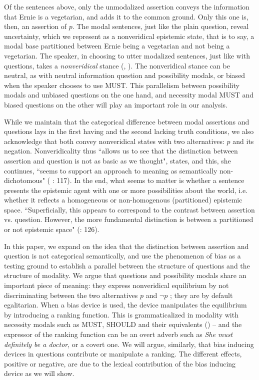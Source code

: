 \documentclass[output=paper,colorlinks,citecolor=brown]{langscibook}
\begin{document}
Of the sentences above, only the unmodalized assertion  conveys the information that Ernie is a vegetarian, and adds it to the common ground.  Only this one is, then, an assertion of $p$.  The modal sentences, just like the plain question, reveal uncertainty, which we represent as a nonveridical epistemic state, that is to say, a modal base partitioned between Ernie being a vegetarian and not being a vegetarian. The speaker, in choosing to utter modalized sentences, just like with questions, takes a \textit{nonveridical} stance (\citealt{giannakidoumari2021a}, \citealt{giannakidoumari2021b}). The nonveridical stance can be neutral, as with neutral information question and possibility modals, or biased when the speaker chooses to use \textsc{MUST}. This parallelism between possibility modals and unbiased questions on the one hand, and necessity modal \textsc{MUST} and biased questions on the other  will play an important role in our analysis.


While we maintain that the categorical difference between modal assertions and questions lays in the first having and the second lacking truth conditions, we also acknowledge that both convey nonveridical states with two alternatives: $p$ and its negation. Nonveridicality thus ``allows us to see that the distinction between assertion and question is not as basic as we thought", \citet{giannakidou2013} states, and this, she continues, ``seems to support an approach to meaning as semantically non-dichotomous" (\citealt{giannakidou2013} : 117).  In the end, what seems to matter is whether a sentence presents the epistemic agent with one or more possibilities about the world, i.e. whether it reflects  a homogeneous or non-homogenous (partitioned) epistemic space. ``Superficially, this appears to correspond to the contrast between assertion vs. question. However, the more fundamental distinction is between a partitioned or not epistemic space" (\citealt{giannakidou2013}: 126).
  
  
In this paper, we expand on the idea  that the distinction between assertion and question is not categorical semantically, and use the phenomenon of bias as a testing ground to establish a parallel between the structure of questions and the structure of modality.  We argue that questions and possibility modals share an important piece of meaning: they express nonveridical equilibrium by not discriminating between the two alternatives $p$ and $\neg p$ ; they are by default egalitarian. When a bias device is used,  the device manipulates the equilibrium by introducing a ranking function. This is grammaticalized in modality with necessity modals such as \textsc{MUST}, \textsc{SHOULD} and their equivalents (\citealt{giannakidoumari2016, giannakidoumari2018b, giannakidoumari2021a, giannakidoumari2021b}) --  and the expressor of the ranking function  can be an overt adverb such as \textit{She must definitely be a doctor}, or a covert one. We will argue, similarly, that bias inducing devices in questions contribute or manipulate a ranking.  The different effects, positive or negative, are due to the lexical contribution of the bias inducing device as we will show.
\end{document}
